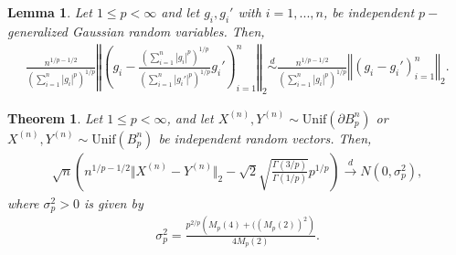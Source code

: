 \documentclass[10pt,a4paper]{amsart}
\newtheorem{theorem}{Theorem}
\newtheorem{lemma}{Lemma}
\begin{document}
\begin{lemma}
\label{LemEquivalentCLTBoundarypball}
Let $1\leq p <\infty$ and let $g_i, g_i'$ with $i=1,...,n$, be independent $p-$generalized Gaussian random variables. Then,
\begin{align*}
\frac{n^{1/p - 1/2}}{\left(\sum _{i=1}^n \left| g_i  \right|^p \right)^{1/p}} \left\Vert   \left( g_i - 
 \frac{\left(\sum _{i=1}^n \left| g_i  \right|^p  \right)^{1/p} }{\left(\sum _{i=1}^n \left| g_i'  \right|^p \right)^{1/p}} g_i' \right)_{i=1}^n \right\Vert _2 \overset{d}{\sim} \frac{n^{1/p - 1/2}}{\left(\sum _{i=1}^n \left| g_i  \right|^p \right)^{1/p}} \left\Vert   \left( g_i - 
   g_i' \right)_{i=1}^n \right\Vert _2 .
\end{align*}
\end{lemma}

\begin{theorem}
\label{Thm:CLTforlpballs}
Let $1\leq p <\infty$, and let $X^{(n)},Y^{(n)} \sim \text{Unif}( \partial B_p^n)$ or $ X^{(n)},Y^{(n)} \sim \text{Unif}(B_p^n)$ be independent random vectors. Then,
\begin{align*}
\sqrt{n} \left( n^{1/p - 1/2} \Vert X^{(n)} - Y^{(n)} \Vert _2 -  \sqrt{2} \sqrt{\frac{\Gamma (3/p)}{\Gamma(1/p)}} p^{1/p}  \right) \overset{d}{\longrightarrow} N(0, \sigma_p ^2),
\end{align*}
where $\sigma_p ^2>0$ is given by
\begin{align*}
\sigma_p ^2 = \frac{p^{2/p} \left( M_p(4) + ((M_p(2))^2 \right)}{4 M_p(2)}.
\end{align*}
\end{theorem}
\end{document}
